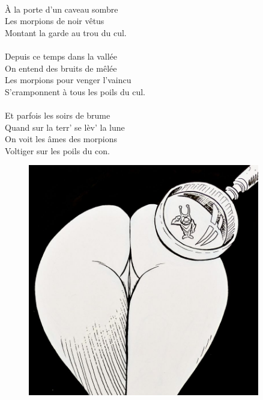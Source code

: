 \\À la porte d'un caveau sombre
\\Les morpions de noir vêtus
\\Montant la garde au trou du cul.
\\\\Depuis ce temps dans la vallée
\\On entend des bruits de mêlée
\\Les morpions pour venger l'vaincu
\\S'cramponnent à tous les poils du cul.
\\\\Et parfois les soirs de brume
\\Quand sur la terr' se lèv' la lune
\\On voit les âmes des morpions
\\Voltiger sur les poils du con.
\\
\begin{figure}[h!]
\centering
   \includegraphics[width=0.9\textwidth]{images/de_profondis.jpg}
 \end{figure}

\breakpage